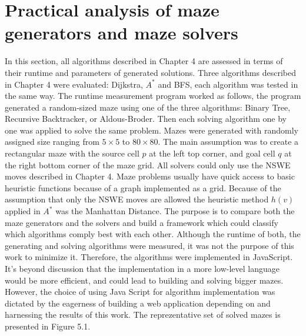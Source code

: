 \section{Practical analysis of maze generators and maze solvers}
In this section, all algorithms described in Chapter 4 are assessed in terms of their runtime and parameters of generated solutions. Three algorithms described
in Chapter 4 were evaluated: Dijkstra, $A^*$ and BFS, each algorithm was tested in the same way. The runtime measurement program worked as follows,
the program generated a random-sized maze using one of the three algorithms: Binary Tree, Recursive Backtracker, or Aldous-Broder. Then each solving
algorithm one by one was applied to solve the same problem. Mazes were generated with randomly assigned size ranging from $5 \times 5$ to $80 \times 80$.
The main assumption was to create a rectangular maze with the source cell $p$ at the left top corner, and goal cell $q$ at the right bottom corner of the maze grid. 
All solvers could only use the NSWE moves described in Chapter 4. Maze problems usually have quick access to basic heuristic functions because of
a graph implemented as a grid. Because of the assumption that only the NSWE moves are allowed the heuristic method $h(v)$ applied in $A^*$ was the
Manhattan Distance.
The purpose is to compare both the maze generators and the solvers and build a framework which could classify which algorithms comply best with each other.
Although the runtime of both, the generating and solving algorithms were measured, it was not the purpose of this work to minimize it. Therefore, the algorithms
were implemented in JavaScript. It's beyond discussion that the implementation in a more low-level language would be more efficient, and could lead to building
and solving bigger mazes. However, the choice of using Java Script for algorithm implementation was dictated by the eagerness of building a web application
depending on and harnessing the results of this work. 
The reprezentative set of solved mazes is presented in Figure 5.1.%
